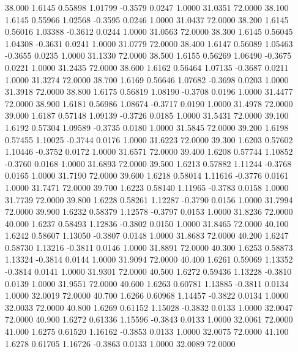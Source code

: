   38.000   1.6145   0.55898   1.01799  -0.3579   0.0247   1.0000  31.0351  72.0000
  38.100   1.6145   0.55966   1.02568  -0.3595   0.0246   1.0000  31.0437  72.0000
  38.200   1.6145   0.56016   1.03388  -0.3612   0.0244   1.0000  31.0563  72.0000
  38.300   1.6145   0.56045   1.04308  -0.3631   0.0241   1.0000  31.0779  72.0000
  38.400   1.6147   0.56089   1.05463  -0.3655   0.0235   1.0000  31.1330  72.0000
  38.500   1.6155   0.56269   1.06490  -0.3675   0.0221   1.0000  31.2435  72.0000
  38.600   1.6162   0.56464   1.07135  -0.3687   0.0211   1.0000  31.3274  72.0000
  38.700   1.6169   0.56646   1.07682  -0.3698   0.0203   1.0000  31.3918  72.0000
  38.800   1.6175   0.56819   1.08190  -0.3708   0.0196   1.0000  31.4477  72.0000
  38.900   1.6181   0.56986   1.08674  -0.3717   0.0190   1.0000  31.4978  72.0000
  39.000   1.6187   0.57148   1.09139  -0.3726   0.0185   1.0000  31.5431  72.0000
  39.100   1.6192   0.57304   1.09589  -0.3735   0.0180   1.0000  31.5845  72.0000
  39.200   1.6198   0.57455   1.10025  -0.3744   0.0176   1.0000  31.6223  72.0000
  39.300   1.6203   0.57602   1.10446  -0.3752   0.0172   1.0000  31.6571  72.0000
  39.400   1.6208   0.57744   1.10852  -0.3760   0.0168   1.0000  31.6893  72.0000
  39.500   1.6213   0.57882   1.11244  -0.3768   0.0165   1.0000  31.7190  72.0000
  39.600   1.6218   0.58014   1.11616  -0.3776   0.0161   1.0000  31.7471  72.0000
  39.700   1.6223   0.58140   1.11965  -0.3783   0.0158   1.0000  31.7739  72.0000
  39.800   1.6228   0.58261   1.12287  -0.3790   0.0156   1.0000  31.7994  72.0000
  39.900   1.6232   0.58379   1.12578  -0.3797   0.0153   1.0000  31.8236  72.0000
  40.000   1.6237   0.58493   1.12836  -0.3802   0.0150   1.0000  31.8465  72.0000
  40.100   1.6242   0.58607   1.13050  -0.3807   0.0148   1.0000  31.8683  72.0000
  40.200   1.6247   0.58730   1.13216  -0.3811   0.0146   1.0000  31.8891  72.0000
  40.300   1.6253   0.58873   1.13324  -0.3814   0.0144   1.0000  31.9094  72.0000
  40.400   1.6261   0.59069   1.13352  -0.3814   0.0141   1.0000  31.9301  72.0000
  40.500   1.6272   0.59436   1.13228  -0.3810   0.0139   1.0000  31.9551  72.0000
  40.600   1.6263   0.60781   1.13885  -0.3811   0.0134   1.0000  32.0019  72.0000
  40.700   1.6266   0.60968   1.14457  -0.3822   0.0134   1.0000  32.0033  72.0000
  40.800   1.6269   0.61152   1.15028  -0.3832   0.0133   1.0000  32.0047  72.0000
  40.900   1.6272   0.61336   1.15596  -0.3843   0.0133   1.0000  32.0061  72.0000
  41.000   1.6275   0.61520   1.16162  -0.3853   0.0133   1.0000  32.0075  72.0000
  41.100   1.6278   0.61705   1.16726  -0.3863   0.0133   1.0000  32.0089  72.0000
